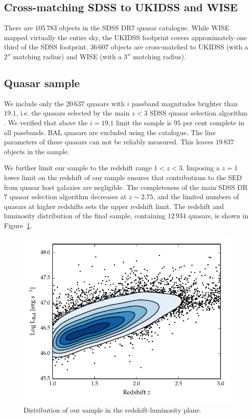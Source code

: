 \subsection{Cross-matching SDSS to UKIDSS and WISE}

There are $105\,783$ objects in the SDSS DR$7$ quasar catalogue. 
While WISE mapped virtually the entire sky, the UKIDSS footprint covers approximately one third of the SDSS footprint. 
$36\,607$ objects are cross-matched to UKIDSS (with a $2''$ matching radius) and WISE (with a $3$$''$ matching radius).

\subsection{Quasar sample}

We include only the $20\,637$ quasars with $i$ passband magnitudes brighter than $19.1$, i.e. the quasars selected by the main $z<3$ SDSS quasar selection algorithm \citep{richards02}. 
We verified that above the $i=19.1$ limit the sample is $95$ per cent complete in all passbands.
BAL quasars are excluded using the \citet{allen11} catalogue.
The  line parameters of these quasars can not be reliably measured.
This leaves $19\,837$  objects in the sample. 

We further limit our sample to the redshift range $1 < z < 3$. 
Imposing a $z=1$ lower limit on the redshift of our sample ensures that contributions to the SED from quasar host galaxies are negligible.
The completeness of the main SDSS DR$7$ quasar selection algorithm decreases at $z\sim2.75$, and the limited numbers of quasars at higher redshifts sets the upper redshift limit. 
The redshift and luminosity distribution of the final sample, containing $12\,934$ quasars, is shown in Figure~\ref{fig:lum_z}. 

\begin{figure}
  \centering
  \includegraphics[width=\textwidth]{figures/chapter05/lum_z.pdf}
  \caption[{Distribution of our sample in the redshift-luminosity plane.}]{Distribution of our sample in the redshift-luminosity plane.}
  \label{fig:lum_z}
\end{figure}

